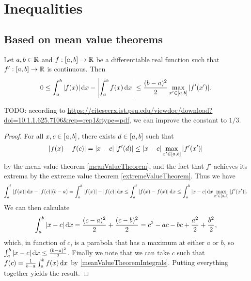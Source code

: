 \section{Inequalities}
\subsection{Based on mean value theorems}
\begin{proposition}
Let $a,b\in \mathbb{R}$ and $f:\interval{a,b}\to \R$ be a differentiable real function such that $f': \interval{a,b}\to \R$ is continuous. Then
\[ 0 \leq \int_a^b|f(x)|\diff{x} - \left|\int_a^bf(x)\diff{x}\right| \leq \frac{(b-a)^2}{2}\max_{x'\in\interval{a,b}}|f'(x')|. \]
\end{proposition}
TODO: according to \url{https://citeseerx.ist.psu.edu/viewdoc/download?doi=10.1.1.625.7106&rep=rep1&type=pdf}, we can improve the constant to $1/3$.
\begin{proof}
For all $x,c\in \interval{a,b}$, there exists $d\in\interval{a,b}$ such that
\[ |f(x)-f(c)| = |x-c|\,|f'(d)| \leq |x-c|\max_{x'\in \interval{a,b}}|f'(x')| \]
by the mean value theorem \ref{meanValueTheorem}, and the fact that $f'$ achieves its extrema by the extreme value theorem \ref{extremeValueTheorem}. Thus we have
\[ \int_a^b|f(x)|\diff{x} - |f(c)|(b-a) = \int_a^b|f(x)| - |f(c)|\diff{x} \leq \int_a^b|f(x) - f(x)|\diff{x}\leq \int_a^b|x-c|\diff{x}\max_{x'\in \interval{a,b}}|f'(x')|. \]
We can then calculate
\[ \int_a^b|x-c|\operatorname{d \!}{x} = \frac{(c-a)^2}{2} + \frac{(c-b)^2}{2} = c^2 -ac-bc + \frac{a^2}{2} + \frac{b^2}{2}, \]
which, in function of $c$, is a parabola that has a maximum at either $a$ or $b$, so $\int_a^b|x-c|\operatorname{d \!}{x}\leq \frac{(b-a)^2}{2}$. Finally we note that we can take $c$ such that $f(c) = \frac{1}{b-a}\int_a^bf(x)\operatorname{d \!}{x}$ by \ref{meanValueTheoremIntegrals}. Putting everything together yields the result.
\end{proof}

